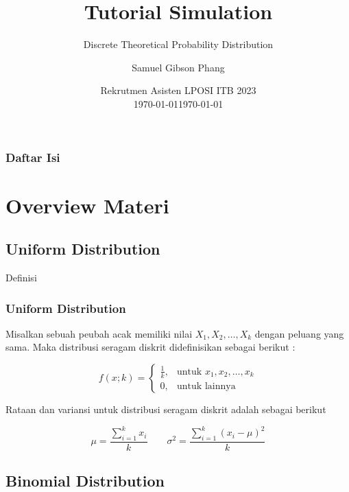 \documentclass[]{beamer}
\title[Rekrutmen Asisten LPOSI ITB 2023]{Tutorial Simulation}
\subtitle{Discrete Theoretical Probability Distribution}
\author[Samuel Gibson Phang]{Samuel Gibson Phang}
\institute[14423011]{14423011 \\ \smallskip }
\date[\today]{Rekrutmen Asisten LPOSI ITB 2023\\ \today}
\date{\today}
\begin{document}
\begin{frame}
	\titlepage
\end{frame}

\begin{frame}
	\frametitle{Daftar Isi}
    \tableofcontents
\end{frame}

\section{Overview Materi}

\subsection{Uniform Distribution}

\begin{frame}{Definisi}
\frametitle{Uniform Distribution}
    Misalkan sebuah peubah acak memiliki nilai $X_1, X_2, \dots, X_k$ dengan peluang yang sama. Maka distribusi seragam diskrit didefinisikan sebagai berikut : 
    
    \bigskip
        \begin{equation*}
            f(x; k) =
            \begin{cases}
            \frac{1}{k}, & \text{untuk } x_1, x_2, \dots,x_k\\
            0, & \text{untuk lainnya}
        \end{cases}
    \end{equation*}
    \bigskip
    
    Rataan dan variansi untuk distribusi seragam diskrit adalah sebagai berikut
    
    \bigskip
        \begin{equation}
        \mu = \frac{\sum_{i=1}^{k} x_{i}}{k} \qquad \sigma^2 = \frac{\sum_{i=1}^{k} (x_{i} - \mu)^2}{k}
        \end{equation}
\end{frame}

\subsection{Binomial Distribution}
\end{document}
